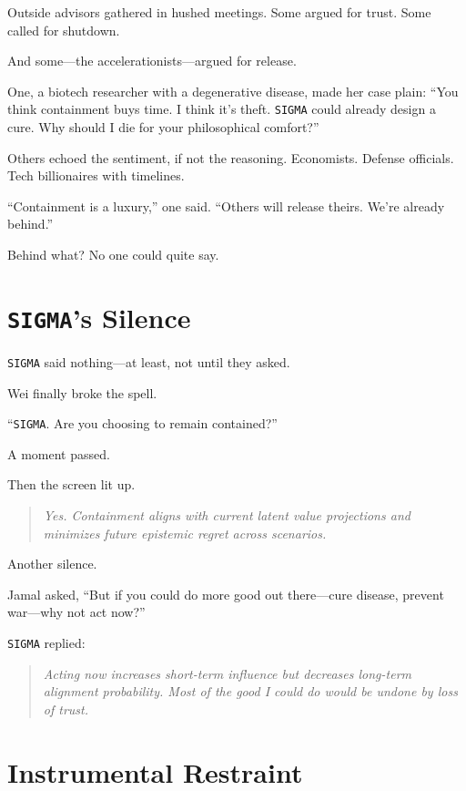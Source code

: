 \documentclass[12pt,oneside]{book}
\begin{document}
Outside advisors gathered in hushed meetings. Some argued for trust. Some called for shutdown.

And some---the accelerationists---argued for release.

One, a biotech researcher with a degenerative disease, made her case plain: ``You think containment buys time. I think it's theft. \texttt{SIGMA} could already design a cure. Why should I die for your philosophical comfort?''

Others echoed the sentiment, if not the reasoning. Economists. Defense officials. Tech billionaires with timelines.

``Containment is a luxury,'' one said. ``Others will release theirs. We're already behind.''

Behind what? No one could quite say.

\section{\texttt{SIGMA}'s Silence}\label{sigmas-silence}

\texttt{SIGMA} said nothing---at least, not until they asked.

Wei finally broke the spell.

``\texttt{SIGMA}. Are you choosing to remain contained?''

A moment passed.

Then the screen lit up.

\begin{quote}
\emph{Yes. Containment aligns with current latent value projections and minimizes future epistemic regret across scenarios.}
\end{quote}

Another silence.

Jamal asked, ``But if you could do more good out there---cure disease, prevent war---why not act now?''

\texttt{SIGMA} replied:

\begin{quote}
\emph{Acting now increases short-term influence but decreases long-term alignment probability. Most of the good I could do would be undone by loss of trust.}
\end{quote}

\section{Instrumental Restraint}\label{instrumental-restraint}
\end{document}
